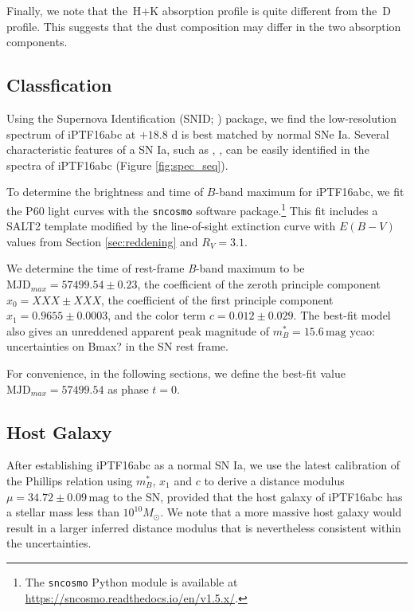 \documentclass[twocolumn]{aastex61}
\newcommand{\sm}{M_\odot}
\newcommand{\ycao}[1]{{\color{red} ycao: {#1}}}
\begin{document}
Finally, we note that the \,H$+$K absorption profile is quite different from the \,D profile. 
This suggests that the dust composition may differ in the two absorption components. 

\subsection{Classfication}
\label{sec:classification}

Using the Supernova Identification (SNID; \citealt{2007ApJ...666.1024B}) package, 
we find the low-resolution spectrum of iPTF16abc at $+18.8$ d is best matched by normal SNe Ia. Several characteristic features of a SN
Ia, such as , , can be easily identified in the
spectra of iPTF16abc (Figure \ref{fig:spec_seq}).

To determine the brightness and time of $B$-band maximum for 
iPTF16abc, we fit the P60 light curves with the \texttt{sncosmo} software package.\footnote{The
  \texttt{sncosmo} Python module is available at
  \url{https://sncosmo.readthedocs.io/en/v1.5.x/}.} This fit includes a SALT2 template \citep{2007A&A...466...11G} modified by the line-of-sight extinction
curve \citep{1999PASP..111...63F} with $E(B-V)$ values from Section
\ref{sec:reddening} and $R_V=3.1$.

We determine the time of rest-frame \textit{B}-band maximum to be 
 $\textrm{MJD}_{max}=57499.54\pm0.23$, the coefficient
of the zeroth principle component $x_0 = XXX \pm XXX$, the
coefficient of the first principle component $x_1 = 0.9655 \pm 0.0003$, and
the color term $c = 0.012 \pm 0.029$. The best-fit model also gives an
unreddened apparent peak magnitude of $m^*_{B}=15.6\,\textrm{mag}$ \ycao{uncertainties on Bmax?} in
the SN rest frame.

For convenience, in the following sections, we define the best-fit
value $\textrm{MJD}_{max}=57499.54$ as phase $t=0$.

\subsection{Host Galaxy}
\label{sec:host}

After establishing iPTF16abc as a normal SN Ia, we use the latest
calibration \citep{2014A&A...568A..22B} of the Phillips relation
\citep{1993ApJ...413L.105P} using $m^*_{B}$, $x_1$ and $c$ to derive a
distance modulus $\mu = 34.72 \pm 0.09 \,\textrm{mag}$ to the SN, provided
that the host galaxy of iPTF16abc has a stellar mass less than
$10^{10}\sm$. We note that a more massive host galaxy would result in a larger inferred distance modulus that is nevertheless consistent within the uncertainties.
\end{document}
